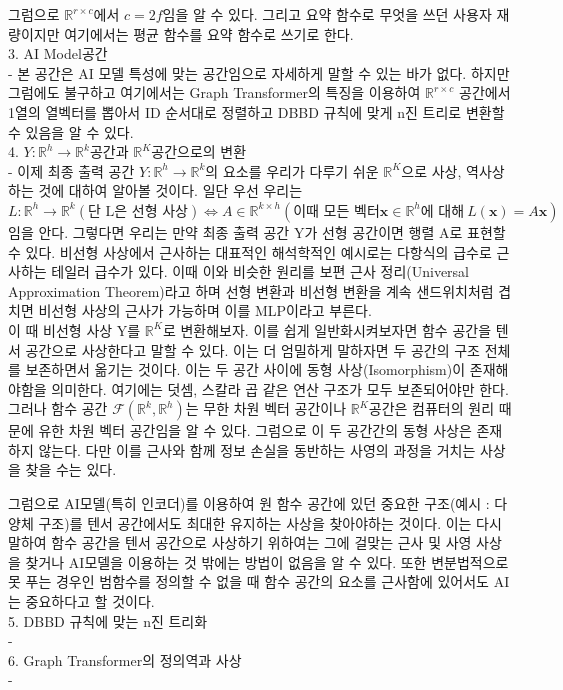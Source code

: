 \documentclass{book}
\begin{document}
\begin{landscape}
 그럼으로 $\mathbb{R}^{r \times c}$에서 $c = 2f$임을 알 수 있다. 그리고 요약 함수로 무엇을 쓰던 사용자 재량이지만 여기에서는 평균 함수를 요약 함수로 쓰기로 한다.\\
 
 3. AI Model공간\\
 - 본 공간은 AI 모델 특성에 맞는 공간임으로 자세하게 말할 수 있는 바가 없다. 하지만 그럼에도 불구하고 여기에서는 Graph Transformer의 특징을 이용하여 $\mathbb{R}^{r \times c}$ 공간에서 1열의 열벡터를 뽑아서 ID 순서대로 정렬하고 DBBD 규칙에 맞게 n진 트리로 변환할 수 있음을 알 수 있다.\\
 
 4. $Y:\mathbb{R}^h\rightarrow\mathbb{R}^k$공간과 $\mathbb{R}^K$공간으로의 변환\\
 - 이제 최종 출력 공간 $Y:\mathbb{R}^h\rightarrow\mathbb{R}^k$의 요소를 우리가 다루기 쉬운 $\mathbb{R}^K$으로 사상, 역사상하는 것에 대하여 알아볼 것이다. 일단 우선 우리는 $L:\mathbb{R}^h\rightarrow\mathbb{R}^k (\text{단 L은 선형 사상}) \Longleftrightarrow A \in \mathbb{R}^{k \times h} (\text{이때 모든 벡터}\mathbf{x} \in \mathbb{R}^h\text{에 대해}~ L(\mathbf{x})= A \mathbf{x})$임을 안다. 그렇다면 우리는 만약 최종 출력 공간 Y가 선형 공간이면 행렬 A로 표현할 수 있다. 비선형 사상에서 근사하는 대표적인 해석학적인 예시로는 다항식의 급수로 근사하는 테일러 급수가 있다. 이때 이와 비슷한 원리를 보편 근사 정리(Universal Approximation Theorem)라고 하며 선형 변환과 비선형 변환을 계속 샌드위치처럼 겹치면 비선형 사상의 근사가 가능하며 이를 MLP이라고 부른다.\\
 
이 때 비선형 사상 Y를 $\mathbb{R}^K$로 변환해보자. 이를 쉽게 일반화시켜보자면 함수 공간을 텐서 공간으로 사상한다고 말할 수 있다. 이는 더 엄밀하게 말하자면 두 공간의 구조 전체를 보존하면서 옮기는 것이다. 이는 두 공간 사이에 동형 사상(Isomorphism)이 존재해야함을 의미한다. 여기에는 덧셈, 스칼라 곱 같은 연산 구조가 모두 보존되어야만 한다. 그러나 함수 공간 $\mathcal{F}(\mathbb{R}^k,\mathbb{R}^h)$는 무한 차원 벡터 공간이나 $\mathbb{R}^K$공간은 컴퓨터의 원리 때문에 유한 차원 벡터 공간임을 알 수 있다. 그럼으로 이 두 공간간의 동형 사상은 존재하지 않는다. 다만 이를 근사와 함께 정보 손실을 동반하는 사영의 과정을 거치는 사상을 찾을 수는 있다.

그럼으로 AI모델(특히 인코더)를 이용하여 원 함수 공간에 있던 중요한 구조(예시 : 다양체 구조)를 텐서 공간에서도 최대한 유지하는 사상을 찾아야하는 것이다. 이는 다시 말하여 함수 공간을 텐서 공간으로 사상하기 위하여는 그에 걸맞는 근사 및 사영 사상을 찾거나 AI모델을 이용하는 것 밖에는 방법이 없음을 알 수 있다. 또한 변분법적으로 못 푸는 경우인 범함수를 정의할 수 없을 때 함수 공간의 요소를 근사함에 있어서도 AI는 중요하다고 할 것이다.\\
 
 5. DBBD 규칙에 맞는 n진 트리화\\
 -\\
 
 6. Graph Transformer의 정의역과 사상\\
 -\\

\end{landscape}
\end{document}
